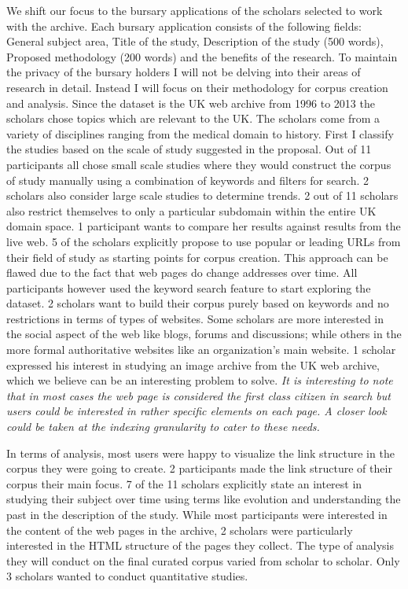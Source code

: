 We shift our focus to the bursary applications of the scholars selected to work with the archive. Each bursary application consists of the following fields: General subject area, Title of the study, Description of the study (500 words), Proposed methodology (200 words) and the benefits of the research. To maintain the privacy of the bursary holders I will not be delving into their areas of research in detail. Instead I will focus on their methodology for corpus creation and analysis. Since the dataset is the UK web archive from 1996 to 2013 the scholars chose topics which are relevant to the UK. The scholars come from a variety of disciplines ranging from the medical domain to history. First I classify the studies based on the scale of study suggested in the proposal. Out of 11 participants all chose small scale studies where they would construct the corpus of study manually using a combination of keywords and filters for search. 2 scholars also consider large scale studies to determine trends. 2 out of 11 scholars also restrict themselves to only a particular subdomain within the entire UK domain space. 1 participant wants to compare her results against results from the live web. 5 of the scholars explicitly propose to use popular or leading URLs from their field of study as starting points for corpus creation. This approach can be flawed due to the fact that web pages do change addresses over time. All participants however used the keyword search feature to start exploring the dataset. 2 scholars want to build their corpus purely based on keywords and no restrictions in terms of types of websites. Some scholars are more interested in the social aspect of the web like blogs, forums and discussions; while others in the more formal authoritative websites like an organization's main website. 1 scholar expressed his interest in studying an image archive from the UK web archive, which we believe can be an interesting problem to solve. \textit{It is interesting to note that in most cases the web page is considered the first class citizen in search but users could be interested in rather specific elements on each page. A closer look could be taken at the indexing granularity to cater to these needs.}

In terms of analysis, most users were happy to visualize the link structure in the corpus they were going to create. 2 participants made the link structure of their corpus their main focus. 7 of the 11 scholars explicitly state an interest in studying their subject over time using terms like evolution and understanding the past in the description of the study. While most participants were interested in the content of the web pages in the archive, 2 scholars were particularly interested in the HTML structure of the pages they collect. The type of analysis they will conduct on the final curated corpus varied from scholar to scholar. Only 3 scholars wanted to conduct quantitative studies. 

